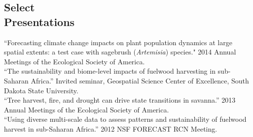 \documentclass[margin,line]{resume}
\begin{document}
\begin{resume}
    \section{\mysidestyle Select\\Presentations}
    ``Forecasting climate change impacts on plant population dynamics at large spatial extents: a test case with sagebrush (\emph{Artemisia}) species." 2014 Annual Meetings of the Ecological Society of America.\vspace{-6mm}\\%
    
    ``The sustainability and biome-level impacts of fuelwood harvesting in sub-Saharan Africa.'' Invited seminar, Geospatial Science Center of Excellence, South Dakota State University.\vspace{-6mm}\\%
    
    ``Tree harvest, fire, and drought can drive state transitions in savanna.'' 2013 Annual Meetings of the Ecological Society of America.\vspace{-6mm}\\%
    
    ``Using diverse multi-scale data to assess patterns and sustainability of fuelwood harvest in sub-Saharan Africa.'' 2012 NSF FORECAST RCN Meeting.\\
    

\end{resume}
\end{document}

